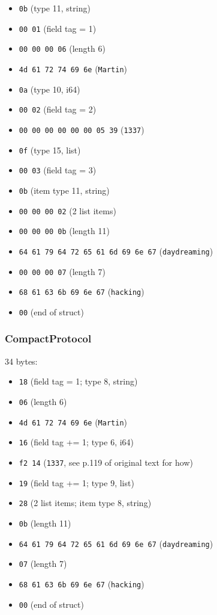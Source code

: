 \documentclass[12pt, titlepage]{article}
\begin{document}
\begin{itemize}
    \item \texttt{0b} (type 11, string)
    \item \texttt{00 01} (field tag = 1)
    \item \texttt{00 00 00 06} (length 6)
    \item \texttt{4d 61 72 74 69 6e} (\texttt{Martin})
    \item \texttt{0a} (type 10, i64)
    \item \texttt{00 02} (field tag = 2)
    \item \texttt{00 00 00 00 00 00 05 39} (\texttt{1337})
    \item \texttt{0f} (type 15, list)
    \item \texttt{00 03} (field tag = 3)
    \item \texttt{0b} (item type 11, string)
    \item \texttt{00 00 00 02} (2 list items)
    \item \texttt{00 00 00 0b} (length 11)
    \item \texttt{64 61 79 64 72 65 61 6d 69 6e 67} (\texttt{daydreaming})
    \item \texttt{00 00 00 07} (length 7)
    \item \texttt{68 61 63 6b 69 6e 67} (\texttt{hacking})
    \item \texttt{00} (end of struct)
\end{itemize}

\subsubsection{CompactProtocol}

34 bytes:

\begin{itemize}
    \item \texttt{18} (field tag = 1; type 8, string)
    \item \texttt{06} (length 6)
    \item \texttt{4d 61 72 74 69 6e} (\texttt{Martin})
    \item \texttt{16} (field tag += 1; type 6, i64)
    \item \texttt{f2 14} (\texttt{1337}, see p.119 of original text for how)
    \item \texttt{19} (field tag += 1; type 9, list)
    \item \texttt{28} (2 list items; item type 8, string)
    \item \texttt{0b} (length 11)
    \item \texttt{64 61 79 64 72 65 61 6d 69 6e 67} (\texttt{daydreaming})
    \item \texttt{07} (length 7)
    \item \texttt{68 61 63 6b 69 6e 67} (\texttt{hacking})
    \item \texttt{00} (end of struct)
\end{itemize}
\end{document}
